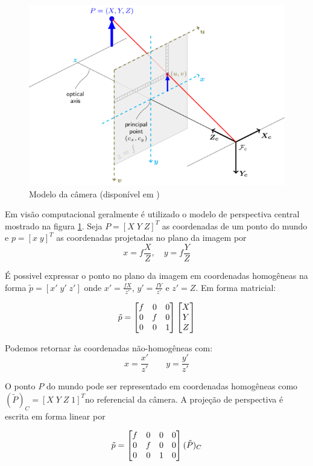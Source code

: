 \begin{figure}[h!]
  \centering
  \includegraphics[width=0.8\linewidth]{./img/camera_model2.png}
  \caption{}
\label{fig:camera_model}
\caption{Modelo da câmera (disponível em \citep{opencvCameraCalibration})}
\end{figure}

Em visão computacional geralmente é utilizado o modelo de perspectiva central mostrado na figura \ref{fig:camera_model}.
Seja ${P} = [X\; Y\; Z]^T$ as coordenadas de um ponto do mundo e ${p} = [x\;y]^T$ as coordenadas projetadas no plano da imagem por
\begin{equation}
x = f \frac{X}{Z}, \quad y = f \frac{Y}{Z}
\end{equation}

É possivel expressar o ponto no plano da imagem em coordenadas homogêneas na forma $\tilde{{p}} = [x'\; y' \; z']$ onde $x' = \frac{fX}{z'}$, $y' = \frac{fY}{z'}$ e $z' = Z$. Em forma matricial:

\begin{equation}
{\tilde{p}} = 
\begin{bmatrix} f & 0 & 0 \\
	 0 & f & 0 \\
	 0 & 0 & 1	
\end{bmatrix}
\begin{bmatrix}X\\Y\\Z\end{bmatrix}
\end{equation}

Podemos retornar às coordenadas não-homogêneas com:
\[ x = \frac{x'}{z'} \qquad y = \frac{y'}{z'}\]

O ponto ${P}$ do mundo pode ser representado em coordenadas homogêneas como $({\tilde{P}})_C = [X \; Y \; Z \; 1]^T$no referencial da câmera. A projeção de perspectiva é escrita em forma linear por 

\begin{equation} \label{eq:projpersp}
\tilde{{p}} = \begin{bmatrix}
    f & 0 & 0 & 0 \\
    0 & f & 0 & 0 \\
    0 & 0 & 1 & 0
\end{bmatrix} (\tilde{{P}})_C
\end{equation}


